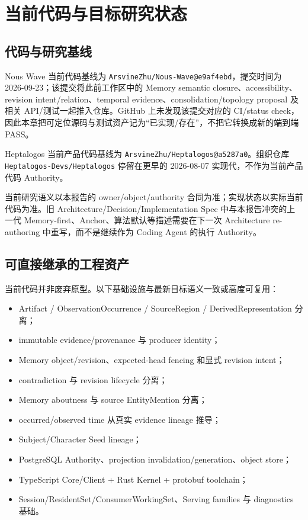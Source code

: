 \chapter{当前代码与目标研究状态}

\section{代码与研究基线}

Nous Wave 当前代码基线为 \texttt{ArsvineZhu/Nous-Wave@e9af4ebd}，提交时间为 2026-09-23；该提交将此前工作区中的 Memory semantic closure、accessibility、revision intent/relation、temporal evidence、consolidation/topology proposal 及相关 API/测试一起推入仓库。GitHub 上未发现该提交对应的 CI/status check，因此本章把可定位源码与测试资产记为“已实现/存在”，不把它转换成新的端到端 PASS。\cite{nous-code-snapshot}

Heptalogos 当前产品代码基线为 \texttt{ArsvineZhu/Heptalogos@a5287a0}。组织仓库 \texttt{Heptalogos-Devs/Heptalogos} 停留在更早的 2026-08-07 实现代，不作为当前产品代码 Authority。\cite{heptalogos-code-snapshot,heptalogos-org-legacy-snapshot}

当前研究语义以本报告的 owner/object/authority 合同为准；实现状态以实际当前代码为准。旧 Architecture/Decision/Implementation Spec 中与本报告冲突的上一代 Memory-first、Anchor、算法默认等描述需要在下一次 Architecture re-authoring 中重写，而不是继续作为 Coding Agent 的执行 Authority。

\section{可直接继承的工程资产}

当前代码并非废弃原型。以下基础设施与最新目标语义一致或高度可复用：

\begin{itemize}
\item Artifact / ObservationOccurrence / SourceRegion / DerivedRepresentation 分离；
\item immutable evidence/provenance 与 producer identity；
\item Memory object/revision、expected-head fencing 和显式 revision intent；
\item contradiction 与 revision lifecycle 分离；
\item Memory aboutness 与 source EntityMention 分离；
\item occurred/observed time 从真实 evidence lineage 推导；
\item Subject/Character Seed lineage；
\item PostgreSQL Authority、projection invalidation/generation、object store；
\item TypeScript Core/Client + Rust Kernel + protobuf toolchain；
\item Session/ResidentSet/ConsumerWorkingSet、Serving families 与 diagnostics 基础。
\end{itemize}

